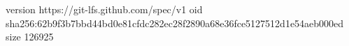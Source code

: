 version https://git-lfs.github.com/spec/v1
oid sha256:62b9f3b7bbd44bd0e81cfdc282ec28f2890a68e36fce5127512d1e54aeb000ed
size 126925
